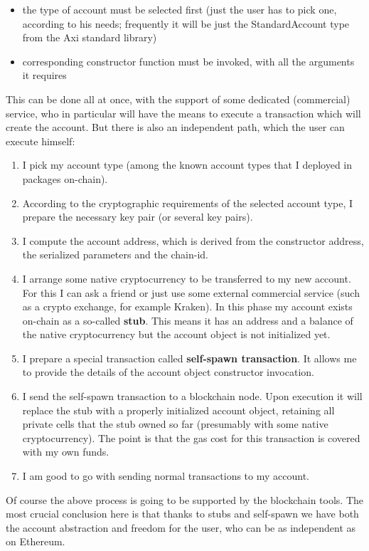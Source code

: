 \documentclass[a4paper]{article}
\begin{document}
\begin{itemize}
  \item the type of account must be selected first (just the user has to pick one, according to his needs; frequently it will be just the StandardAccount type from the Axi standard library)
  \item corresponding constructor function must be invoked, with all the arguments it requires
\end{itemize}

This can be done all at once, with the support of some dedicated (commercial) service, who in particular will have the means to execute a transaction which will create the account. But there is also an independent path, which the user can execute himself:

\begin{enumerate}
  \item I pick my account type (among the known account types that I deployed in packages on-chain).
  \item According to the cryptographic requirements of the selected account type, I prepare the necessary key pair (or several key pairs).
  \item I compute the account address, which is derived from the constructor address, the serialized parameters and the chain-id.
  \item I arrange some native cryptocurrency to be transferred to my new account. For this I can ask a friend or just use some external commercial service (such as a crypto exchange, for example Kraken). In this phase my account exists on-chain as a so-called \textbf{stub}. This means it has an address and a balance of the native cryptocurrency but the account object is not initialized yet.
  \item I prepare a special transaction called \textbf{self-spawn transaction}. It allows me to provide the details of the account object constructor invocation.
  \item I send the self-spawn transaction to a blockchain node. Upon execution it will replace the stub with a properly initialized account object, retaining all private cells that the stub owned so far (presumably with some native cryptocurrency). The point is that the gas cost for this transaction is covered with my own funds.
  \item I am good to go with sending normal transactions to my account.
\end{enumerate}

Of course the above process is going to be supported by the blockchain tools. The most crucial conclusion here is that thanks to stubs and self-spawn we have both the account abstraction and freedom for the user, who can be as independent as on Ethereum.
\end{document}

